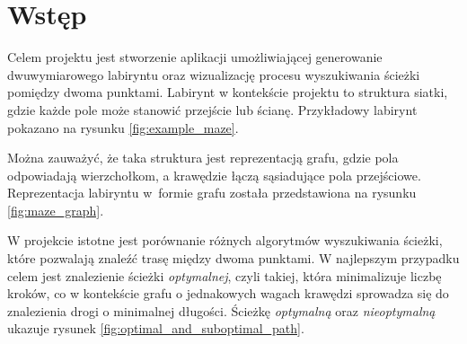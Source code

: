 \section{Wstęp}

Celem projektu jest stworzenie aplikacji umożliwiającej generowanie dwuwymiarowego labiryntu oraz wizualizację procesu wyszukiwania ścieżki pomiędzy dwoma punktami.
Labirynt w kontekście projektu to struktura siatki, gdzie każde pole może stanowić przejście lub ścianę. Przykładowy labirynt pokazano na rysunku \ref{fig:example_maze}.



Można zauważyć, że taka struktura jest reprezentacją grafu, gdzie pola odpowiadają wierzchołkom, a krawędzie łączą sąsiadujące pola przejściowe. Reprezentacja labiryntu w~formie grafu została przedstawiona na rysunku \ref{fig:maze_graph}.



W projekcie istotne jest porównanie różnych algorytmów wyszukiwania ścieżki, które pozwalają znaleźć trasę między dwoma punktami. W najlepszym przypadku celem jest znalezienie ścieżki \textit{optymalnej}, czyli takiej, która minimalizuje liczbę kroków, co w kontekście grafu o jednakowych wagach krawędzi sprowadza się do znalezienia drogi o minimalnej długości. Ścieżkę \textit{optymalną} oraz \textit{nieoptymalną} ukazuje rysunek \ref{fig:optimal_and_suboptimal_path}. 

\newpage

